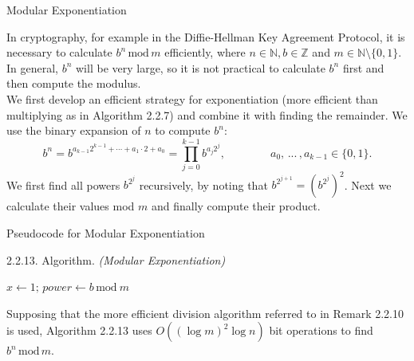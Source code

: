 \documentclass[smaller,hyperref={CJKbookmarks=true}]{beamer}
\newcommand{\N}{\mathbb{N}} \newcommand{\Z}{\mathbb{Z}} \newcommand{\Q}{\mathbb{Q}}
\newcounter{zhuo}[subsection]
\begin{document}
\begin{frame}[c]{Modular Exponentiation}
\begin{spacing}{1.1}
In cryptography, for example in the Diffie-Hellman Key Agreement Protocol, it is necessary to calculate $b^n\,\text{mod}\,m$ efficiently, where $n\in\N,b\in\Z$ and $m\in\N\setminus\{0,1\}$. In general, $b^n$ will be very large, so it is not practical to calculate $b^n$ first and then compute the modulus.\\[6pt]
We first develop an efficient strategy for exponentiation (more efficient
than multiplying as in Algorithm 2.2.7) and combine it with finding the
remainder. We use the binary expansion of $n$ to compute $b^n$:
\[b^n=b^{a_{k-1}2^{k-1}+\cdots+a_1\cdot2+a_0}=\prod_{j=0}^{k-1}
b^{a_j2^j},\qquad\qquad a_0,\,...\,,a_{k-1}\in\{0,1\}.\]
We first find all powers $b^{2^j}$ recursively, by noting that $b^{2^{j+1}}=(b^{2^j})^2$. Next we calculate their values mod $m$ and finally compute their product.
\end{spacing}
\end{frame}
\begin{frame}[c]{Pseudocode for Modular Exponentiation}
\begin{spacing}{1.1}
\alert{2.2.13. Algorithm.} \emph{(Modular Exponentiation)}\\[2pt]
\IncMargin{1em}
\begin{algorithm}[H]
$x\leftarrow1;\,power\leftarrow b\,\text{mod}\:m$\;
\end{algorithm}\DecMargin{1em}
\vspace*{7pt}
Supposing that the more efficient division algorithm referred to in Remark 2.2.10 is used, Algorithm 2.2.13 uses $O((\log m)^2\log n)$ bit operations to find $b^n\,\text{mod}\,m$.
\end{spacing}
\end{frame}
\end{document}
